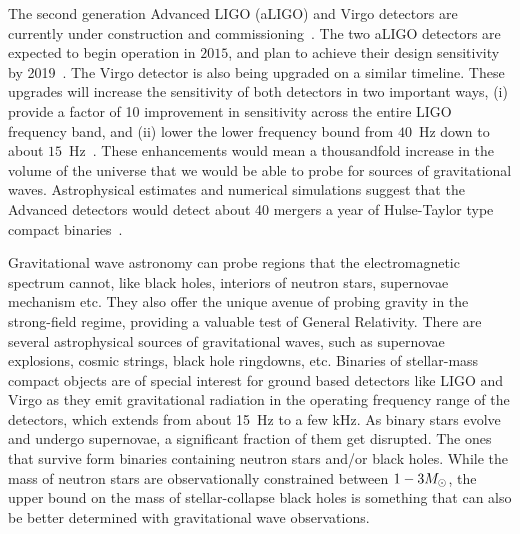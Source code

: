 The second generation Advanced LIGO (aLIGO) and Virgo detectors are currently
under construction and commissioning~\cite{Harry:2010zz,aVIRGO}.
The two aLIGO detectors are expected to begin operation in $2015$, and
plan to achieve their design sensitivity by 2019~\cite{Aasi:2013wya}. 
The Virgo detector is also being upgraded on a similar timeline. 
These upgrades will increase the sensitivity of both detectors in two 
important ways, (i) provide a factor of 10 improvement in sensitivity 
across the entire LIGO frequency band, and (ii) lower the lower frequency
bound from $40$~Hz down to about $15$~Hz~\cite{Harry:2010zz}. 
These enhancements would mean a thousandfold increase in the volume of the
universe that we would be able to probe for sources of gravitational waves. 
Astrophysical estimates and numerical simulations suggest that the Advanced
detectors would detect about 40 mergers a year of Hulse-Taylor type compact
binaries~\cite{LSCCBCRates2010}. 


Gravitational wave astronomy can probe regions that the electromagnetic
spectrum cannot, like black holes, interiors of neutron stars, supernovae
mechanism etc. They also offer the unique avenue of probing gravity in 
the strong-field regime, providing a valuable test of General Relativity.
There are several astrophysical sources of gravitational waves, such as 
supernovae explosions, cosmic strings, black hole ringdowns, etc. 
Binaries of stellar-mass compact objects are of special interest for 
ground based detectors like LIGO and Virgo as they emit gravitational 
radiation in the operating frequency range of the detectors, which
extends from about 15~Hz to a few kHz. As binary stars evolve and 
undergo supernovae, a significant 
fraction of them get disrupted. The ones that survive form binaries
containing neutron stars and/or black holes. While the mass of neutron
stars are observationally constrained between $1-3M_\odot$, the upper bound 
on the mass of stellar-collapse black holes is something that can also 
be better determined with gravitational wave observations. 

